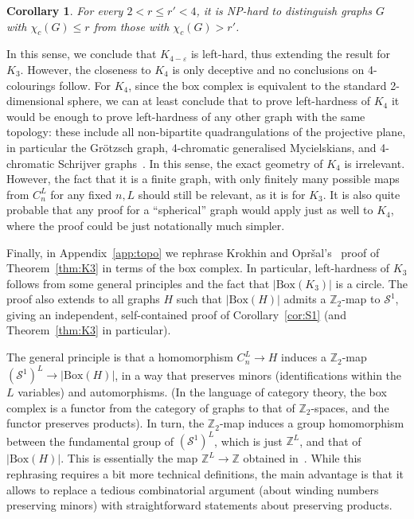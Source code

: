 \documentclass[11pt,a4paper]{scrartcl}
\numberwithin{theorem}{section}
\newtheorem{corollary}[theorem]{Corollary}
\theoremstyle{definition}
\newcommand{\ZZ}{\mathbb{Z}}
\newcommand{\eps}{\varepsilon}
\newcommand\Sphere{\mathcal{S}}
\newcommand\BBox[1]{\left|\mathrm{Box}(#1)\right|}
\begin{document}
\begin{corollary}
	For every $2<r \leq r'<4$, it is NP-hard to distinguish graphs $G$ with $\chi_c(G) \leq r$ from those with $\chi_c(G) > r'$.
\end{corollary}

In this sense, we conclude that $K_{4-\eps}$ is left-hard, thus extending the result for $K_3$.
However, the closeness to $K_4$ is only deceptive and no conclusions on 4-colourings follow.
For $K_4$, since the box complex is equivalent to the standard 2-dimensional sphere, we can at least conclude that to prove left-hardness of $K_4$ it would be enough to prove left-hardness of any other graph with the same topology:
these include all non-bipartite quadrangulations of the projective plane, in
particular the Gr\"{o}tzsch graph, 4-chromatic generalised Mycielskians, and
4-chromatic Schrijver graphs~\cite{matousek2008using,BjornerL03}.
In this sense, the exact geometry of $K_4$ is irrelevant.
However, the fact that it is a finite graph, with only finitely many possible maps from $C_n^L$ for any fixed $n,L$ should still be relevant, as it is for $K_3$.
It is also quite probable that any proof for a ``spherical'' graph would apply just as well to $K_4$, where the proof could be just notationally much simpler.

\bigskip

Finally, in Appendix~\ref{app:topo} we rephrase Krokhin and Opr\v{s}al's~\cite{KrokhinO19} proof of Theorem~\ref{thm:K3} in terms of the box complex.
In particular, left-hardness of $K_3$ follows from some general principles and the fact that $\BBox{K_3}$ is a circle.
The proof also extends to all graphs $H$ such that $\BBox{H}$ admits a $\ZZ_2$-map to $\Sphere^1$,
giving an independent, self-contained proof of Corollary~\ref{cor:S1} (and Theorem~\ref{thm:K3}  in particular).

The general principle is that a homomorphism $C_n^L \to H$ induces a $\ZZ_2$-map $(\Sphere^1)^L \to \BBox{H}$, in a way that preserves minors (identifications within the $L$ variables) and automorphisms. (In the language of category theory, the box complex is a functor from the category of graphs to that of $\ZZ_2$-spaces, and the functor preserves products).
In turn, the $\ZZ_2$-map induces a group homomorphism between the fundamental group of $(\Sphere^1)^L$, which is just $\ZZ^L$, and that of $\BBox{H}$.
This is essentially the map $\ZZ^L \to \ZZ$ obtained in~\cite{KrokhinO19}.
While this rephrasing requires a bit more technical definitions, the main advantage is that it allows to replace a tedious combinatorial argument (about winding numbers preserving minors) with straightforward statements about preserving products.
\end{document}
